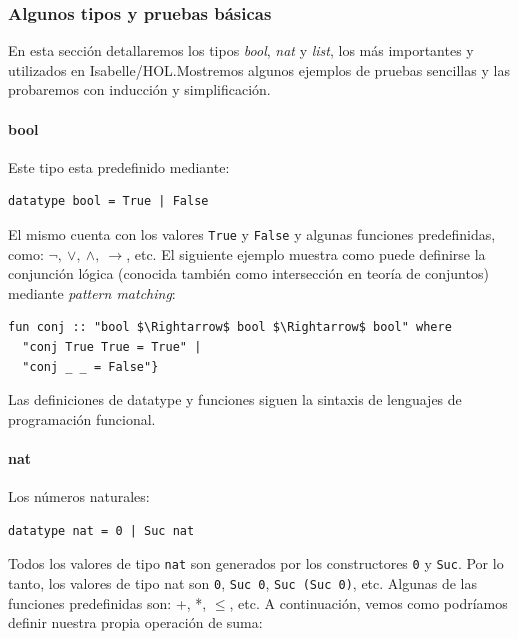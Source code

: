 \documentclass[12pt]{book}
\begin{document}
\subsubsection{Algunos tipos y pruebas básicas}

En esta sección detallaremos los tipos \textit{bool}, \textit{nat} y \textit{list}, los más importantes y utilizados en Isabelle/HOL.\@ Mostremos algunos ejemplos de pruebas sencillas y las probaremos con inducción y simplificación.

\paragraph{bool}

Este tipo esta predefinido mediante:

\begin{lstlisting}[style=Isabelle]
datatype bool = True | False
\end{lstlisting}

El mismo cuenta con los valores \texttt{True} y \texttt{False} y algunas funciones predefinidas,\\ como:  $\neg,\ \vee,\ \wedge,\ \rightarrow$, etc. El siguiente ejemplo muestra como puede definirse la conjunción lógica (conocida también como intersección en teoría de conjuntos) mediante \textit{pattern matching}:

\begin{lstlisting}[style=Isabelle]
  fun conj :: "bool $\Rightarrow$ bool $\Rightarrow$ bool" where
  "conj True True = True" |
  "conj _ _ = False"}
\end{lstlisting}

Las definiciones de datatype y funciones siguen la sintaxis de lenguajes de programación funcional.

\paragraph{nat}

Los números naturales:

\begin{lstlisting}[style=Isabelle]
datatype nat = 0 | Suc nat
\end{lstlisting}

Todos los valores de tipo \texttt{nat} son generados por los constructores \texttt{0} y \texttt{Suc}. Por lo tanto, los valores de tipo nat son \texttt{0}, \texttt{Suc 0}, \texttt{Suc (Suc 0)}, etc. Algunas de las funciones predefinidas son: +, *, $\leq$, etc. A continuación, vemos como podríamos definir nuestra propia operación de suma:
\end{document}
